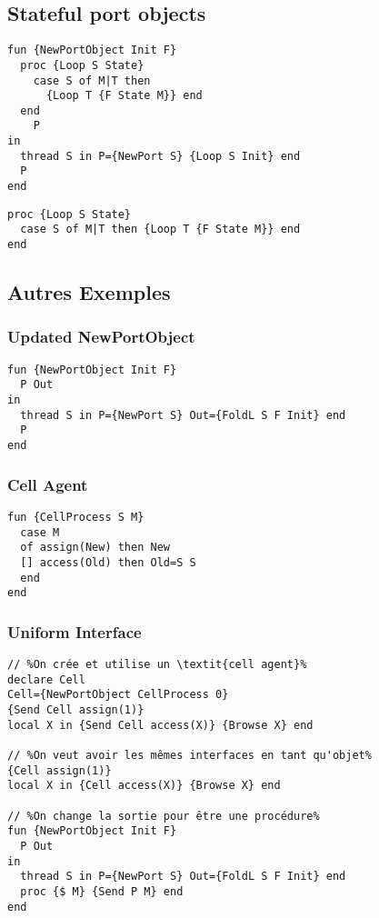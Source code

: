 \documentclass{report}
\begin{document}
\subsection{Stateful port objects}
\begin{lstlisting}[escapechar=\%]
fun {NewPortObject Init F} 
  proc {Loop S State} 
    case S of M|T then 
      {Loop T {F State M}} end
  end 
    P
in
  thread S in P={NewPort S} {Loop S Init} end 
  P
end
\end{lstlisting}
\begin{lstlisting}[escapechar=\%]
proc {Loop S State} 
  case S of M|T then {Loop T {F State M}} end
end
\end{lstlisting}

\subsection{Autres Exemples}
\subsubsection*{Updated NewPortObject}
\begin{lstlisting}[escapechar=\%]
fun {NewPortObject Init F} 
  P Out
in
  thread S in P={NewPort S} Out={FoldL S F Init} end 
  P
end
\end{lstlisting}

\subsubsection*{Cell Agent}
\begin{lstlisting}[escapechar=\%]
fun {CellProcess S M} 
  case M 
  of assign(New) then New 
  [] access(Old) then Old=S S 
  end
end
\end{lstlisting}

\subsubsection*{Uniform Interface}
\begin{lstlisting}[escapechar=\%]
// %On crée et utilise un \textit{cell agent}%
declare Cell 
Cell={NewPortObject CellProcess 0} 
{Send Cell assign(1)}
local X in {Send Cell access(X)} {Browse X} end

// %On veut avoir les mêmes interfaces en tant qu'objet%
{Cell assign(1)} 
local X in {Cell access(X)} {Browse X} end

// %On change la sortie pour être une procédure%
fun {NewPortObject Init F} 
  P Out
in
  thread S in P={NewPort S} Out={FoldL S F Init} end 
  proc {$ M} {Send P M} end
end
\end{lstlisting}
\end{document}
